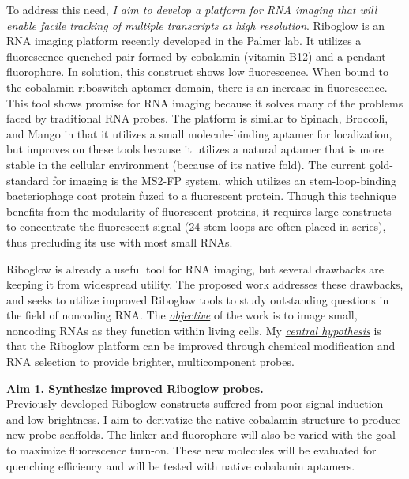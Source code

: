 To address this need, \textit{I aim to develop a platform for RNA imaging that will enable facile tracking of multiple transcripts at high resolution}. Riboglow is an RNA imaging platform recently developed in the Palmer lab. It utilizes a fluorescence-quenched pair formed by cobalamin (vitamin B12) and a pendant fluorophore. In solution, this construct shows low fluorescence. When bound to the cobalamin riboswitch aptamer domain\cite{JohnsonJrB12cofactorsdirectly2012}, there is an increase in fluorescence. This tool shows promise for RNA imaging because it solves many of the problems faced by traditional RNA probes. The platform is similar to Spinach\cite{PaigeRNAMimicsGreen2011}, Broccoli\cite{FilonovBroccoliRapidSelection2014}, and Mango\cite{AutourFluorogenicRNAMango2018,DolgosheinaRNAMangoAptamerFluorophore2014} in that it utilizes a small molecule-binding aptamer for localization, but improves on these tools because it utilizes a natural aptamer that is more stable in the cellular environment (because of its native fold). The current gold-standard for imaging is the MS2-FP system\cite{FuscoSinglemRNAMolecules2003}, which utilizes an stem-loop-binding bacteriophage coat protein fuzed to a fluorescent protein. Though this technique benefits from the modularity of fluorescent proteins, it requires large constructs to concentrate the fluorescent signal (24 stem-loops are often placed in series), thus precluding its use with most small RNAs.

Riboglow is already a useful tool for RNA imaging, but several drawbacks are keeping it from widespread utility. The proposed work addresses these drawbacks, and seeks to utilize improved Riboglow tools to study outstanding questions in the field of noncoding RNA. The \underline{\textit{objective}} of the work is to image small, noncoding RNAs as they function within living cells. My \underline{\textit{central hypothesis}} is that the Riboglow platform can be improved through chemical modification and RNA selection to provide brighter, multicomponent probes.

{\bf \underline{Aim 1.} Synthesize improved Riboglow probes.}\\
Previously developed Riboglow constructs suffered from poor signal induction and low brightness. I aim to derivatize the native cobalamin structure to produce new probe scaffolds. The linker and fluorophore will also be varied with the goal to maximize fluorescence turn-on. These new molecules will be evaluated for quenching efficiency and will be tested with native cobalamin aptamers.

